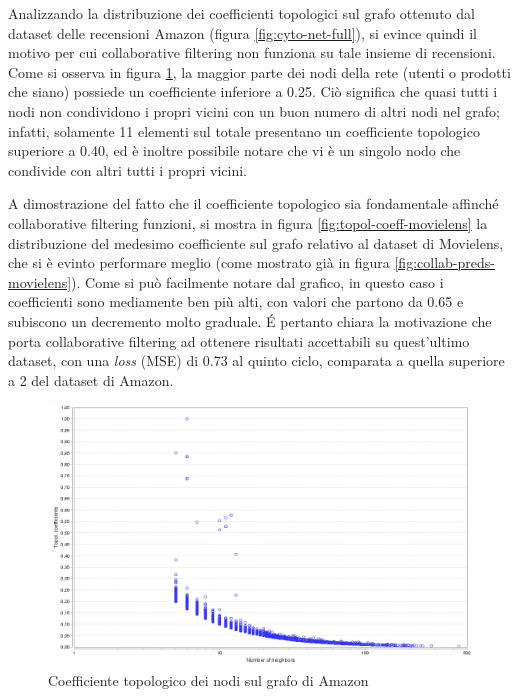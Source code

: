 \documentclass[hidelinks, 12pt]{article}
\begin{document}
Analizzando la distribuzione dei coefficienti topologici sul grafo ottenuto dal dataset delle recensioni Amazon (figura \ref{fig:cyto-net-full}), si evince quindi il motivo per cui collaborative filtering non funziona su tale insieme di recensioni. Come si osserva in figura \ref{fig:topol-coeff-amazon}, la maggior parte dei nodi della rete (utenti o prodotti che siano) possiede un coefficiente inferiore a 0.25. Ciò significa che quasi tutti i nodi non condividono i propri vicini con un buon numero di altri nodi nel grafo; infatti, solamente 11 elementi sul totale presentano un coefficiente topologico superiore a 0.40, ed è inoltre possibile notare che vi è un singolo nodo che condivide con altri tutti i propri vicini.

A dimostrazione del fatto che il coefficiente topologico sia fondamentale affinché collaborative filtering funzioni, si mostra in figura \ref{fig:topol-coeff-movielens} la distribuzione del medesimo coefficiente sul grafo relativo al dataset di Movielens, che si è evinto performare meglio (come mostrato già in figura \ref{fig:collab-preds-movielens}). Come si può facilmente notare dal grafico, in questo caso i coefficienti sono mediamente ben più alti, con valori che partono da 0.65 e subiscono un decremento molto graduale. É pertanto chiara la motivazione che porta collaborative filtering ad ottenere risultati accettabili su quest'ultimo dataset, con una \textit{loss} (MSE) di 0.73 al quinto ciclo, comparata a quella superiore a 2 del dataset di Amazon.

\begin{figure}[H]
	\centering
	\includegraphics[scale=0.25]{images/07_07_topological.png}
	\caption[Coefficiente topologico dei nodi sul grafo di Amazon]{Coefficiente topologico dei nodi sul grafo di Amazon}
	\label{fig:topol-coeff-amazon}
\end{figure}
\end{document}
